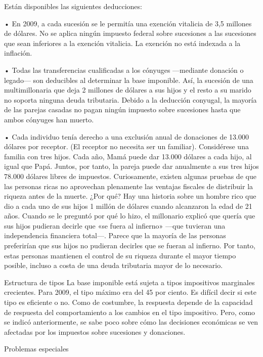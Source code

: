 \documentclass[10pt,a4paper]{article}
\begin{document}
Están disponibles las siguientes deducciones:

• En 2009, a cada sucesión se le permitía una exención vitalicia de 3,5 millones de dólares. No se aplica ningún impuesto federal sobre sucesiones a las sucesiones que sean inferiores a la exención vitalicia. La exención no está indexada a la inflación.

• Todas las transferencias cualificadas a los cónyuges —mediante donación o legado— son deducibles al determinar la base imponible. Así, la sucesión de una multimillonaria que deja 2 millones de dólares a sus hijos y el resto a su marido no soporta ninguna deuda tributaria. Debido a la deducción conyugal, la mayoría de las parejas casadas no pagan ningún impuesto sobre sucesiones hasta que ambos cónyuges han muerto.

• Cada individuo tenía derecho a una exclusión anual de donaciones de 13.000 dólares por receptor. (El receptor no necesita ser un familiar). Considérese una familia con tres hijos. Cada año, Mamá puede dar 13.000 dólares a cada hijo, al igual que Papá. Juntos, por tanto, la pareja puede dar anualmente a sus tres hijos 78.000 dólares libres de impuestos. Curiosamente, existen algunas pruebas de que las personas ricas no aprovechan plenamente las ventajas fiscales de distribuir la riqueza antes de la muerte. ¿Por qué? Hay una historia sobre un hombre rico que dio a cada uno de sus hijos 1 millón de dólares cuando alcanzaron la edad de 21 años. Cuando se le preguntó por qué lo hizo, el millonario explicó que quería que sus hijos pudieran decirle que «se fuera al infierno» —que tuvieran una independencia financiera total—. Parece que la mayoría de las personas preferirían que sus hijos no pudieran decirles que se fueran al infierno. Por tanto, estas personas mantienen el control de su riqueza durante el mayor tiempo posible, incluso a costa de una deuda tributaria mayor de lo necesario.

Estructura de tipos 
La base imponible está sujeta a tipos impositivos marginales crecientes. Para 2009, el tipo máximo era del 45 por ciento. Es difícil decir si este tipo es eficiente o no. Como de costumbre, la respuesta depende de la capacidad de respuesta del comportamiento a los cambios en el tipo impositivo. Pero, como se indicó anteriormente, se sabe poco sobre cómo las decisiones económicas se ven afectadas por los impuestos sobre sucesiones y donaciones.



Problemas especiales 
\end{document}
